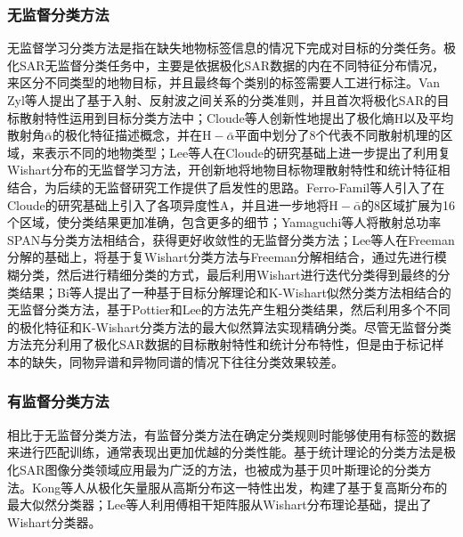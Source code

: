 \subsubsection{无监督分类方法}
无监督学习分类方法是指在缺失地物标签信息的情况下完成对目标的分类任务。极化SAR无监督分类任务中，主要是依据极化SAR数据的内在不同特征分布情况，来区分不同类型的地物目标，并且最终每个类别的标签需要人工进行标注。Van Zyl等人提出了基于入射、反射波之间关系的分类准则，并且首次将极化SAR的目标散射特性运用到目标分类方法中；Cloude等人创新性地提出了极化熵$\mathrm{H}$以及平均散射角$\bar{\alpha}$的极化特征描述概念，并在$\mathrm{H}-\bar{\alpha}$平面中划分了8个代表不同散射机理的区域，来表示不同的地物类型；Lee等人在Cloude的研究基础上进一步提出了利用复Wishart分布的无监督学习方法，开创新地将地物目标物理散射特性和统计特征相结合，为后续的无监督研究工作提供了启发性的思路。Ferro-Famil等人引入了在Cloude的研究基础上引入了各项异度性$\mathrm{A}$，并且进一步地将$\mathrm{H}-\bar{\alpha}$的8区域扩展为16个区域，使分类结果更加准确，包含更多的细节；Yamaguchi等人将散射总功率SPAN与分类方法相结合，获得更好收敛性的无监督分类方法；Lee等人在Freeman分解的基础上，将基于复Wishart分类方法与Freeman分解相结合，通过先进行模糊分类，然后进行精细分类的方式，最后利用Wishart进行迭代分类得到最终的分类结果；Bi等人提出了一种基于目标分解理论和K-Wishart似然分类方法相结合的无监督分类方法，基于Pottier和Lee的方法先产生粗分类结果，然后利用多个不同的极化特征和K-Wishart分类方法的最大似然算法实现精确分类。尽管无监督分类方法充分利用了极化SAR数据的目标散射特性和统计分布特性，但是由于标记样本的缺失，同物异谱和异物同谱的情况下往往分类效果较差。

\subsubsection{有监督分类方法}
相比于无监督分类方法，有监督分类方法在确定分类规则时能够使用有标签的数据来进行匹配训练，通常表现出更加优越的分类性能。基于统计理论的分类方法是极化SAR图像分类领域应用最为广泛的方法，也被成为基于贝叶斯理论的分类方法。Kong等人从极化矢量服从高斯分布这一特性出发，构建了基于复高斯分布的最大似然分类器；Lee等人利用傅相干矩阵服从Wishart分布理论基础，提出了Wishart分类器。

